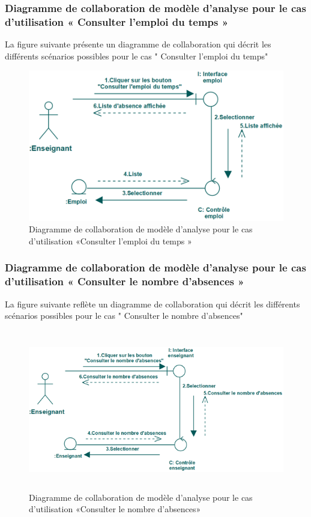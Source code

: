 \documentclass[12 pt ]{report}
\begin{document}
\subsubsection{Diagramme  de  collaboration  de  modèle  d'analyse  pour  le  cas  d'utilisation « Consulter l'emploi du temps »  }
La figure suivante présente un diagramme de collaboration qui décrit les différents
scénarios possibles pour le cas " Consulter l'emploi du temps"
\begin{figure}[h]
\begin{center}
\includegraphics[width= 14cm , height =5 cm]{colla_ens_consulteremploi.PNG}
 \caption{Diagramme  de  collaboration  de  modèle  d'analyse  pour  le  cas  d'utilisation «Consulter l'emploi du temps »}
\end{center}
\end{figure}
\subsubsection{Diagramme  de  collaboration  de  modèle  d'analyse  pour  le  cas  d'utilisation « Consulter le nombre d'absences »  }
La figure suivante reflète un diagramme de collaboration qui décrit les différents
scénarios possibles pour le cas " Consulter le nombre d'absences"
\begin{figure}[h]
\begin{center}
\includegraphics[width= 14cm , height =7cm]{colla_ens_consulternombreabsence.PNG}
 \caption{Diagramme  de  collaboration  de  modèle  d'analyse  pour  le  cas  d'utilisation «Consulter le nombre d'absences»}
\end{center}
\end{figure}
\end{document}
